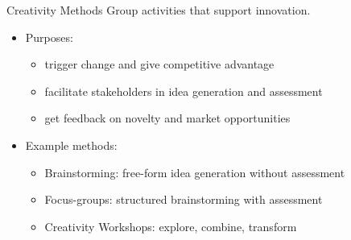 \begin{Slide}{Creativity Methods}
Group activities that support innovation.
\begin{itemize}
\item Purposes: 
\begin{itemize}
\item trigger change and give competitive advantage
\item facilitate stakeholders in idea generation and assessment
\item get feedback on novelty and market opportunities
\end{itemize}
\item Example methods:
\begin{itemize}
\item Brainstorming: free-form idea generation without assessment
\item Focus-groups: structured brainstorming with assessment
\item Creativity Workshops: explore, combine, transform


\end{itemize}
\end{itemize}
\end{Slide}